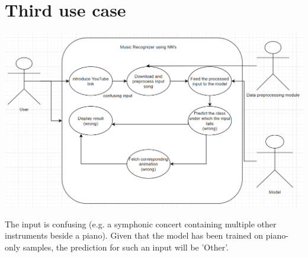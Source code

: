 \section{Third use case}

\begin{center}
	\centering
	\includegraphics[width = 5.5in]{images/usecase2.png}
\centerline{}
	\label{uc2}
	\end{center}
 The input is confusing (e.g. a symphonic concert containing multiple other instruments beside a piano). Given that the model has been trained on piano-only samples, the prediction for such an input will be 'Other'.
